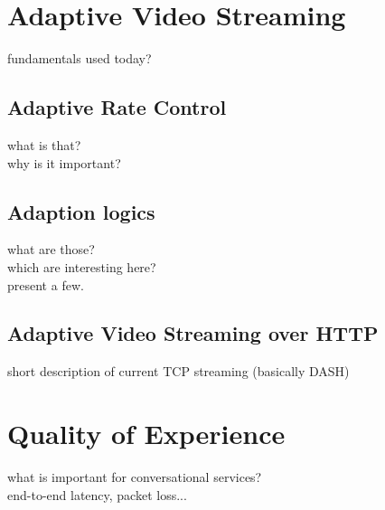 \section{Adaptive Video Streaming}
fundamentals used today?

\subsection{Adaptive Rate Control}
what is that? \\
why is it important?

\subsection{Adaption logics}
what are those? \\
which are interesting here? \\
present a few.

\subsection{Adaptive Video Streaming over HTTP}
short description of current TCP streaming (basically DASH)

\section{Quality of Experience}
what is important for conversational services? \\
end-to-end latency, packet loss...

